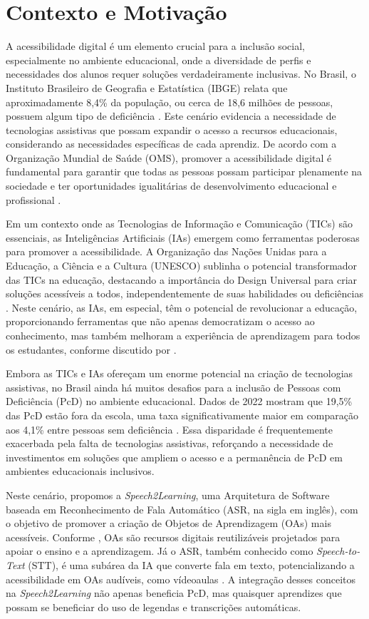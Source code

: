 \section{Contexto e Motivação}

A acessibilidade digital é um elemento crucial para a inclusão social, especialmente no ambiente educacional, onde a diversidade de perfis e necessidades dos alunos requer soluções verdadeiramente inclusivas. No Brasil, o Instituto Brasileiro de Geografia e Estatística (IBGE) relata que aproximadamente 8,4\% da população, ou cerca de 18,6 milhões de pessoas, possuem algum tipo de deficiência \cite{IBGE2022}. Este cenário evidencia a necessidade de tecnologias assistivas que possam expandir o acesso a recursos educacionais, considerando as necessidades específicas de cada aprendiz. De acordo com a Organização Mundial de Saúde (OMS), promover a acessibilidade digital é fundamental para garantir que todas as pessoas possam participar plenamente na sociedade e ter oportunidades igualitárias de desenvolvimento educacional e profissional \cite{OMS2011, OMS2018}.

Em um contexto onde as Tecnologias de Informação e Comunicação (TICs) são essenciais, as Inteligências Artificiais (IAs) emergem como ferramentas poderosas para promover a acessibilidade. A Organização das Nações Unidas para a Educação, a Ciência e a Cultura (UNESCO) sublinha o potencial transformador das TICs na educação, destacando a importância do Design Universal para criar soluções acessíveis a todos, independentemente de suas habilidades ou deficiências \cite{UNESCO2023, GovBr2023}. Neste cenário, as IAs, em especial, têm o potencial de revolucionar a educação, proporcionando ferramentas que não apenas democratizam o acesso ao conhecimento, mas também melhoram a experiência de aprendizagem para todos os estudantes, conforme discutido por .

Embora as TICs e IAs ofereçam um enorme potencial na criação de tecnologias assistivas, no Brasil ainda há muitos desafios para a inclusão de Pessoas com Deficiência (PcD) no ambiente educacional. Dados de 2022 mostram que 19,5\% das PcD estão fora da escola, uma taxa significativamente maior em comparação aos 4,1\% entre pessoas sem deficiência \cite{IBGE2022}. Essa disparidade é frequentemente exacerbada pela falta de tecnologias assistivas, reforçando a necessidade de investimentos em soluções que ampliem o acesso e a permanência de PcD em ambientes educacionais inclusivos.

Neste cenário, propomos a \textit{Speech2Learning}, uma Arquitetura de Software baseada em Reconhecimento de Fala Automático (ASR, na sigla em inglês), com o objetivo de promover a criação de Objetos de Aprendizagem (OAs) mais acessíveis. Conforme , OAs são recursos digitais reutilizáveis projetados para apoiar o ensino e a aprendizagem. Já o ASR, também conhecido como \textit{Speech-to-Text} (STT), é uma subárea da IA que converte fala em texto, potencializando a acessibilidade em OAs audíveis, como vídeoaulas \cite{Jurafsky2024}. A integração desses conceitos na \textit{Speech2Learning} não apenas beneficia PcD, mas quaisquer aprendizes que possam se beneficiar do uso de legendas e transcrições automáticas.

